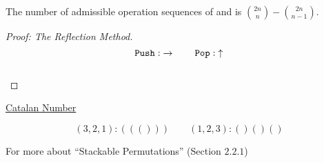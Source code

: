 \begin{frame}{}
  \begin{theorem}
    The number of admissible operation sequences of \texttt{\it {}} and \texttt{\it {}} is ${2n \choose n} - {2n \choose n-1}$.
  \end{theorem}

  \pause
  \begin{proof}[Proof: The Reflection Method]
    \[
      \texttt{Push}{}: \;\rightarrow \qquad \texttt{Pop}{}: \;\uparrow
    \]

    \begin{columns}
      \pause
	\begin{center}
	  \resizebox{0.80\textwidth}{!}{}
	\end{center}
    \end{columns}
  \end{proof}
\end{frame}

\begin{frame}{}
  \begin{center}
    \resizebox{0.60\textwidth}{!}{}
  \end{center}
\end{frame}

\begin{frame}{}
  \begin{center}
    \resizebox{0.60\textwidth}{!}{}
  \end{center}
\end{frame}

\begin{frame}{}
  \centerline{\Large \href{https://en.wikipedia.org/wiki/Catalan\_number}{Catalan Number}}

  \[
    (3,2,1): ((())) \qquad (1,2,3): ()()()
  \]
\end{frame}

\begin{frame}{}
  \begin{center}
    {\Large For more about ``Stackable Permutations'' {\large (Section $2.2.1$)}}
  \end{center}

  \vspace{0.30cm}
  \begin{columns}
  \end{columns}
\end{frame}
